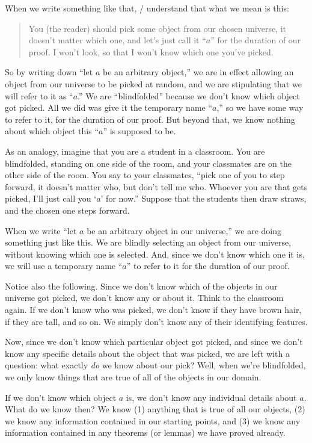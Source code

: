 \documentclass[../../../main.tex]{subfiles}
\begin{document}
\noindent
When we write something like that, \mathers/ understand that what we mean is this:

\begin{quote}
  You (the reader) should pick some object from our chosen universe, it doesn't matter which one, and let's just call it ``$a$'' for the duration of our proof. I won't look, so that I won't know which one you've picked.
\end{quote}

So by writing down ``let $a$ be an arbitrary object,'' we are in effect allowing an object from our universe to be picked at random, and we are stipulating that we will refer to it as ``$a$.'' We are ``blindfolded'' because we don't know which object got picked. All we did was give it the temporary name ``$a$,'' so we have some way to refer to it, for the duration of our proof. But beyond that, we know nothing about which object this ``$a$'' is supposed to be.

As an analogy, imagine that you are a student in a classroom. You are blindfolded, standing on one side of the room, and your classmates are on the other side of the room. You say to your classmates, ``pick one of you to step forward, it doesn't matter who, but don't tell me who. Whoever you are that gets picked, I'll just call you `$a$' for now.'' Suppose that the students then draw straws, and the chosen one steps forward.

When we write ``let $a$ be an arbitrary object in our universe,'' we are doing something just like this. We are blindly selecting an object from our universe, without knowing which one is selected. And, since we don't know which one it is, we will use a temporary name ``$a$'' to refer to it for the duration of our proof.

Notice also the following. Since we don't know which of the objects in our universe got picked, we don't know any  or  about it. Think to the classroom again. If we don't know who was picked, we don't know if they have brown hair, if they are tall, and so on. We simply don't know any of their identifying features.

Now, since we don't know which particular object got picked, and since we don't know any specific details about the object that was picked, we are left with a question: what exactly \emph{do} we know about our pick? Well, when we're blindfolded, we only know things that are true of all of the objects in our domain.

\begin{aside}
  \begin{remark}
    If we don't know which object $a$ is, we don't know any individual details about $a$. What do we know then? We know (1) anything that is true of all our objects, (2) we know any information contained in our starting points, and (3) we know any information contained in any theorems (or lemmas) we have proved already.
  \end{remark}
\end{aside}
\end{document}
